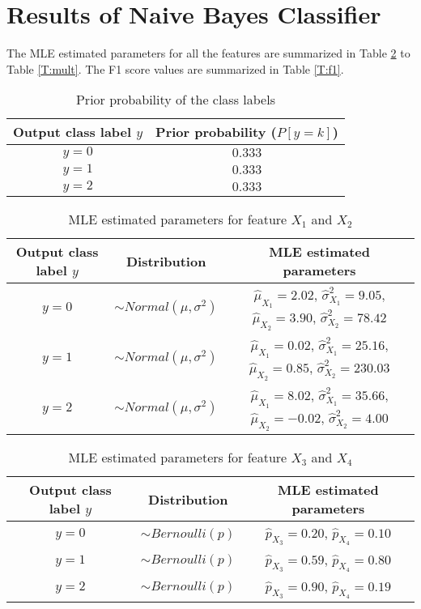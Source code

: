 \documentclass[12pt, a4paper, twoside]{article}
\begin{document}
\section{Results of Naive Bayes Classifier}
The MLE estimated parameters for all the features are summarized in Table \ref{T:normal} to Table \ref{T:mult}.
The F1 score values are summarized in Table \ref{T:f1}.
{
	\renewcommand{\arraystretch}{2}
	\begin{table}[p]
		\begin{center}
			\begin{tabular}{c c}
				\hline
				Output class label $y$ & Prior probability ($P[y = k]$) \\ \hline
				$y = 0$ & $0.333$ \\ \hline
				$y = 1$ & $0.333$  \\ \hline
				$y = 2$& $0.333$ \\ \hline
			\end{tabular}
			\caption{Prior probability of the class labels}\label{T:prior}
		\end{center}
	\end{table}
}
{
	\renewcommand{\arraystretch}{2}
	\begin{table}[p]
		\begin{center}
			\begin{tabular}{c c c}
				\hline
				Output class label $y$ & Distribution & MLE estimated parameters \\ \hline
				$y = 0$& $\sim Normal(\mu, \sigma^2)$& $\hat{\mu}_{X_1} = 2.02$, $\hat{\sigma}_{X_1}^2 = 9.05$, $\hat{\mu}_{X_2} = 3.90$, $\hat{\sigma}_{X_2}^2 = 78.42$ \\ \hline
				$y = 1$& $\sim Normal(\mu, \sigma^2)$& $\hat{\mu}_{X_1} = 0.02$, $\hat{\sigma}_{X_1}^2 = 25.16$, $\hat{\mu}_{X_2} = 0.85 $, $\hat{\sigma}_{X_2}^2 = 230.03$ \\ \hline
				$y = 2$& $\sim Normal(\mu, \sigma^2)$& $\hat{\mu}_{X_1} = 8.02$, $\hat{\sigma}_{X_1}^2 = 35.66$, $\hat{\mu}_{X_2} = -0.02 $, $\hat{\sigma}_{X_2}^2 = 4.00$ \\ \hline
			\end{tabular}
			\caption{MLE estimated parameters for feature $X_1$ and $X_2$}\label{T:normal}
		\end{center}
	\end{table}
}
{
	\renewcommand{\arraystretch}{2}
	\begin{table}[p]
		\begin{center}
			\begin{tabular}{c c c}
				\hline
				Output class label $y$ & Distribution & MLE estimated parameters  \\ \hline
				$y = 0$& $\sim Bernoulli(p)$& $\hat{p}_{X_3} = 0.20$, $\hat{p}_{X_4} = 0.10$ \\ \hline
				$y = 1$& $\sim Bernoulli(p)$& $\hat{p}_{X_3} = 0.59$, $\hat{p}_{X_4} = 0.80$ \\ \hline
				$y = 2$& $\sim Bernoulli(p)$& $\hat{p}_{X_3} = 0.90$, $\hat{p}_{X_4} = 0.19$ \\ \hline
			\end{tabular}
			\caption{MLE estimated parameters for feature $X_3$ and $X_4$}\label{T:ber}
		\end{center}
	\end{table}
}
\end{document}
